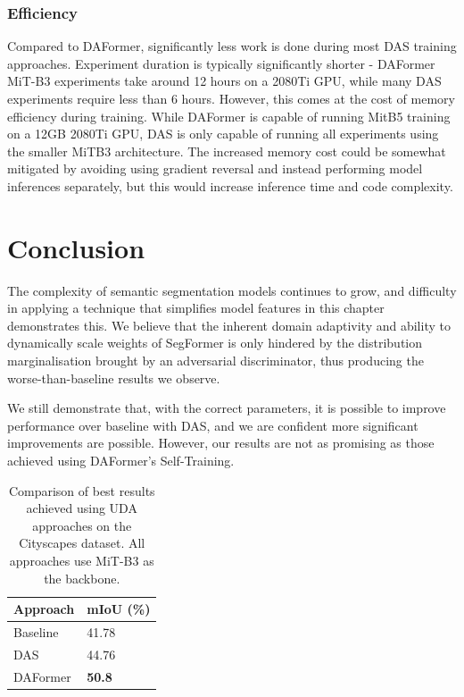 \documentclass[a4paper,12pt]{report}
\begin{document}
\subsubsection{Efficiency}
Compared to DAFormer, significantly less work is done during most DAS training approaches. Experiment duration is typically significantly shorter - DAFormer MiT-B3 experiments take around 12 hours on a 2080Ti GPU, while many DAS experiments require less than 6 hours. However, this comes at the cost of memory efficiency during training. While DAFormer is capable of running MitB5 training on a 12GB 2080Ti GPU, DAS is only capable of running all experiments using the smaller MiTB3 architecture. The increased memory cost could be somewhat mitigated by avoiding using gradient reversal and instead performing model inferences separately, but this would increase inference time and code complexity.

\section{Conclusion}
The complexity of semantic segmentation models continues to grow, and difficulty in applying a technique that simplifies model features in this chapter demonstrates this. We believe that the inherent domain adaptivity and ability to dynamically scale weights of SegFormer is only hindered by the distribution marginalisation brought by an adversarial discriminator, thus producing the worse-than-baseline results we observe.

We still demonstrate that, with the correct parameters, it is possible to improve performance over baseline with DAS, and we are confident more significant improvements are possible. However, our results are not as promising as those achieved using DAFormer's Self-Training.

\begin{table}[h]
    \centering
    \begin{tabular}{|l|l|}
        \hline
        Approach & mIoU (\%)     \\ \hline
        Baseline & 41.78         \\ \hline
        DAS      & 44.76         \\ \hline
        DAFormer \cite{hoyer_daformer_2022} & \textbf{50.8} \\ \hline
    \end{tabular}
    \caption{Comparison of best results achieved using UDA approaches on the Cityscapes dataset. All approaches use MiT-B3 as the backbone.}
\end{table}
\end{document}
